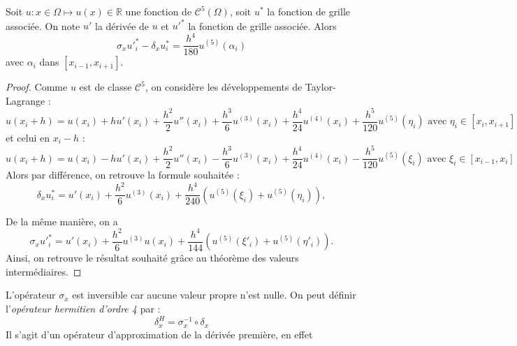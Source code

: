 \begin{proposition}
Soit $u : x \in \Omega \mapsto u(x) \in \mathbb{R}$ une fonction de $\mathcal{C}^5 ( \Omega )$, soit $u^*$ la fonction de grille associée. On note $u'$ la dérivée de $u$ et $u'^*$ la fonction de grille associée. Alors 
\begin{equation}
\sigma_x u'^*_i - \delta_x u^*_i = \dfrac{h^4}{180}u^{(5)}(\alpha_i)
\end{equation}
avec $\alpha_i$ dans $[x_{i-1}, x_{i+1}]$.
\label{prop:consistence_herm}
\end{proposition}

\begin{proof}
Comme $u$ est de classe $\mathcal{C}^5$, on considère les développements de Taylor-Lagrange :
\begin{equation}
u(x_i+h) = u(x_i) + h u'(x_i) + \dfrac{h^2}{2} u''(x_i) + \dfrac{h^3}{6}u^{(3)}(x_i) + \dfrac{h^4}{24}u^{(4)}(x_i) + \dfrac{h^5}{120}u^{(5)}(\eta_i) \text{ avec } \eta_i \in [x_i, x_{i+1}]
\end{equation}
et celui en $x_i-h$ :
\begin{equation}
u(x_i+h) = u(x_i) - h u'(x_i) + \dfrac{h^2}{2} u''(x_i) - \dfrac{h^3}{6}u^{(3)}(x_i) + \dfrac{h^4}{24}u^{(4)}(x_i) - \dfrac{h^5}{120}u^{(5)}(\xi_i) \text{ avec } \xi_i \in [x_{i-1}, x_{i}]
\end{equation}
Alors par différence, on retrouve la formule souhaitée : 
\begin{equation}
\delta_x u^*_i = u'(x_i) + \dfrac{h^2}{6} u^{(3)}(x_i) +  \dfrac{h^4}{240} \left( u^{(5)}(\xi_i) + u^{(5)}(\eta_i) \right),
\end{equation}

De la même manière, on a 
\begin{equation}
\sigma_x u'^*_i = u'(x_i) +  \dfrac{h^2}{6} u^{(3)}u(x_i) + \dfrac{h^4}{144} \left( u^{(5)}(\xi'_i) + u^{(5)}(\eta'_i) \right).
\end{equation}
Ainsi, on retrouve le résultat souhaité grâce au théorème des valeurs intermédiaires.
\end{proof}

L'opérateur $\sigma_x$ est inversible car aucune valeur propre n'est nulle. On peut définir l'\textit{opérateur hermitien d'ordre 4} par :
\begin{equation}
\delta_x^H = \sigma_x^{-1} \circ \delta_x
\label{def:herm_4}
\end{equation}
Il s'agit d'un opérateur d'approximation de la dérivée première, en effet

